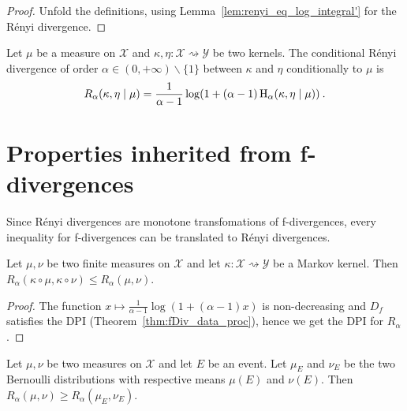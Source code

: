 \begin{proof}\leanok
{}
Unfold the definitions, using Lemma~\ref{lem:renyi_eq_log_integral'} for the Rényi divergence.
\end{proof}

\begin{definition}
  \label{def:condRenyi}
  \leanok
  Let $\mu$ be a measure on $\mathcal X$ and $\kappa, \eta : \mathcal X \rightsquigarrow \mathcal Y$ be two kernels. The conditional Rényi divergence of order $\alpha \in (0,+\infty) \backslash \{1\}$ between $\kappa$ and $\eta$ conditionally to $\mu$ is
  \begin{align*}
  R_\alpha(\kappa, \eta \mid \mu) =\frac{1}{\alpha - 1} \log (1 + (\alpha - 1) \operatorname{H}_\alpha(\kappa, \eta \mid \mu)) \: .
  \end{align*}
\end{definition}

\section{Properties inherited from f-divergences}

Since Rényi divergences are monotone transfomations of f-divergences, every inequality for f-divergences can be translated to Rényi divergences.

\begin{theorem}
  \label{thm:renyi_data_proc}
  \leanok
  Let $\mu, \nu$ be two finite measures on $\mathcal X$ and let $\kappa : \mathcal X \rightsquigarrow \mathcal Y$ be a Markov kernel.
  Then $R_\alpha(\kappa \circ \mu, \kappa \circ \nu) \le R_\alpha(\mu, \nu)$.
\end{theorem}

\begin{proof} \leanok
{}
The function $x \mapsto \frac{1}{\alpha - 1}\log (1 + (\alpha - 1)x)$ is non-decreasing and $D_f$ satisfies the DPI (Theorem~\ref{thm:fDiv_data_proc}), hence we get the DPI for $R_\alpha$.
\end{proof}

\begin{lemma}
  \label{lem:renyi_data_proc_event}
  Let $\mu, \nu$ be two measures on $\mathcal X$ and let $E$ be an event. Let $\mu_E$ and $\nu_E$ be the two Bernoulli distributions with respective means $\mu(E)$ and $\nu(E)$.
  Then $R_\alpha(\mu, \nu) \ge R_\alpha(\mu_E, \nu_E)$.
\end{lemma}

